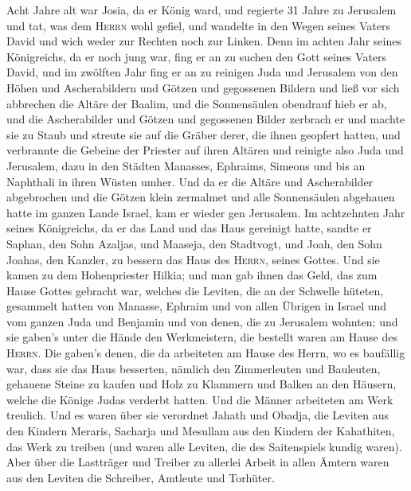  Acht Jahre alt war Josia, da er König ward, und regierte
31 Jahre zu Jerusalem  und tat, was dem \textsc{Herrn}
wohl gefiel, und wandelte in den Wegen seines Vaters David und wich
weder zur Rechten noch zur Linken.  Denn im achten Jahr
seines Königreichs, da er noch jung war, fing er an zu suchen den Gott
seines Vaters David, und im zwölften Jahr fing er an zu reinigen Juda
und Jerusalem von den Höhen und Ascherabildern und Götzen und gegossenen
Bildern  und ließ vor sich abbrechen die Altäre der
Baalim, und die Sonnensäulen obendrauf hieb er ab, und die Ascherabilder
und Götzen und gegossenen Bilder zerbrach er und machte sie zu Staub und
streute sie auf die Gräber derer, die ihnen geopfert hatten,
 und verbrannte die Gebeine der Priester auf ihren Altären
und reinigte also Juda und Jerusalem,  dazu in den Städten
Manasses, Ephraims, Simeons und bis an Naphthali in ihren Wüsten umher.
 Und da er die Altäre und Ascherabilder abgebrochen und
die Götzen klein zermalmet und alle Sonnensäulen abgehauen hatte im
ganzen Lande Israel, kam er wieder gen Jerusalem.  Im
achtzehnten Jahr seines Königreichs, da er das Land und das Haus
gereinigt hatte, sandte er Saphan, den Sohn Azaljas, und Maaseja, den
Stadtvogt, und Joah, den Sohn Joahas, den Kanzler, zu bessern das Haus
des \textsc{Herrn}, seines Gottes.  Und sie kamen zu dem
Hohenpriester Hilkia; und man gab ihnen das Geld, das zum Hause Gottes
gebracht war, welches die Leviten, die an der Schwelle hüteten,
gesammelt hatten von Manasse, Ephraim und von allen Übrigen in Israel
und vom ganzen Juda und Benjamin und von denen, die zu Jerusalem
wohnten;  und sie gaben's unter die Hände den
Werkmeistern, die bestellt waren am Hause des \textsc{Herrn}. Die
gaben's denen, die da arbeiteten am Hause des Herrn, wo es baufällig
war, dass sie das Haus besserten,  nämlich den
Zimmerleuten und Bauleuten, gehauene Steine zu kaufen und Holz zu
Klammern und Balken an den Häusern, welche die Könige Judas verderbt
hatten.  Und die Männer arbeiteten am Werk treulich. Und
es waren über sie verordnet Jahath und Obadja, die Leviten aus den
Kindern Meraris, Sacharja und Mesullam aus den Kindern der Kahathiten,
das Werk zu treiben (und waren alle Leviten, die des Saitenspiels kundig
waren).  Aber über die Lastträger und Treiber zu allerlei
Arbeit in allen Ämtern waren aus den Leviten die Schreiber, Amtleute und
Torhüter.

